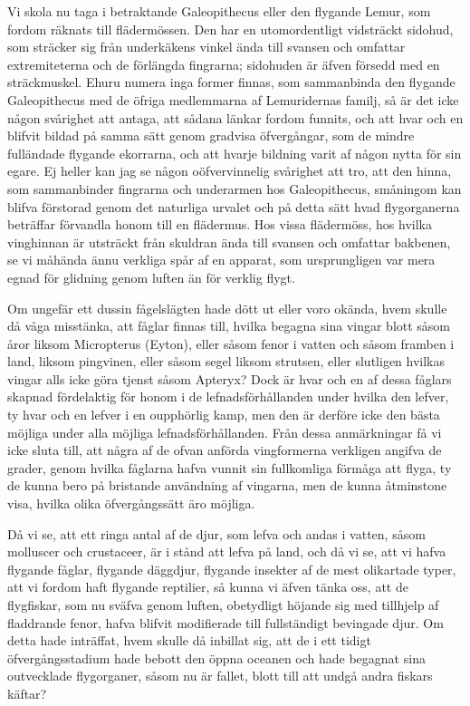 Vi skola nu taga i betraktande Galeopithecus eller den flygande Lemur, som fordom räknats till flädermössen. Den har en utomordentligt vidsträckt sidohud, som sträcker sig från underkäkens vinkel ända till svansen och omfattar extremiteterna och de förlängda fingrarna; sidohuden är äfven försedd med en sträckmuskel. Ehuru numera inga former finnas, som sammanbinda den flygande Galeopithecus med de öfriga medlemmarna af Lemuridernas familj, så är det icke någon svårighet att antaga, att sådana länkar fordom funnits, och att hvar och en blifvit bildad på samma sätt genom gradvisa öfvergångar, som de mindre fulländade flygande ekorrarna, och att hvarje bildning varit af någon nytta för sin egare. Ej heller kan jag se någon oöfvervinnelig svårighet att tro, att den hinna, som sammanbinder fingrarna och underarmen hos Galeopithecus, småningom kan blifva förstorad genom det naturliga urvalet och på detta sätt hvad flygorganerna beträffar förvandla honom till en flädermus. Hos vissa flädermöss, hos hvilka vinghinnan är utsträckt från skuldran ända till svansen och omfattar bakbenen, se vi måhända ännu verkliga spår af en apparat, som ursprungligen var mera egnad för glidning genom luften än för verklig flygt.

Om ungefär ett dussin fågelslägten hade dött ut eller voro okända, hvem skulle då våga misstänka, att fåglar finnas till, hvilka begagna sina vingar blott såsom åror liksom Micropterus (Eyton), eller såsom fenor i vatten och såsom framben i land, liksom pingvinen, eller såsom segel liksom strutsen, eller slutligen hvilkas vingar alls icke göra tjenst såsom Apteryx? Dock är hvar och en af dessa fåglars skapnad fördelaktig för honom i de lefnadsförhållanden under hvilka den lefver, ty hvar och en lefver i en oupphörlig kamp, men den är derföre icke den bästa möjliga under alla möjliga lefnadsförhållanden. Från dessa anmärkningar få vi icke sluta till, att några af de ofvan anförda vingformerna verkligen angifva de grader, genom hvilka fåglarna hafva vunnit sin fullkomliga förmåga att flyga, ty de kunna bero på bristande användning af vingarna, men de kunna åtminstone visa, hvilka olika öfvergångssätt äro möjliga.

Då vi se, att ett ringa antal af de djur, som lefva och andas i vatten, såsom molluscer och crustaceer, är i stånd att lefva på land, och då vi se, att vi hafva flygande fåglar, flygande däggdjur, flygande insekter af de mest olikartade typer, att vi fordom haft flygande reptilier, så kunna vi äfven tänka oss, att de flygfiskar, som nu sväfva genom luften, obetydligt höjande sig med tillhjelp af fladdrande fenor, hafva blifvit modifierade till fullständigt bevingade djur. Om detta hade inträffat, hvem skulle då inbillat sig, att de i ett tidigt öfvergångsstadium hade bebott den öppna oceanen och hade begagnat sina outvecklade flygorganer, såsom nu är fallet, blott till att undgå andra fiskars käftar?

